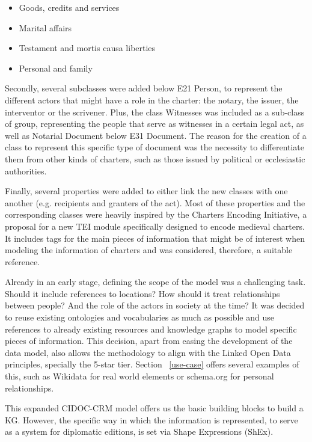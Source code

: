 \documentclass{article}
\begin{document}
\begin{itemize}
    \item Goods, credits and services
    \item Marital affairs
    \item Testament and mortis causa liberties
    \item Personal and family
\end{itemize}

Secondly, several subclasses were added below E21 Person, to represent the different actors that might have a role in the charter: the notary, the issuer, the interventor or the scrivener.
Plus, the class Witnesses was included as a sub-class of group, representing the people that serve as witnesses in a certain legal act, as well as Notarial Document below E31 Document.
The reason for the creation of a class to represent this specific type of document was the necessity to differentiate them from other kinds of charters, such as those issued by political or ecclesiastic authorities.

Finally, several properties were added to either link the new classes with one another (e.g. recipients and granters of the act).
Most of these properties and the corresponding classes were heavily inspired by the Charters Encoding Initiative, a proposal for a new TEI module specifically designed to encode medieval charters\cite{vogeler2014cei}.
It includes tags for the main pieces of information that might be of interest when modeling the information of charters and was considered, therefore, a suitable reference.

Already in an early stage, defining the scope of the model was a challenging task.
Should it include references to locations? How should it treat relationships between people? And the role of the actors in society at the time?
It was decided to reuse existing ontologies and vocabularies as much as possible and use references to already existing resources and knowledge graphs to model specific pieces of information.
This decision, apart from easing the development of the data model, also allows the methodology to align with the Linked Open Data principles, specially the 5-star tier.
Section ~\ref{use-case} offers several examples of this, such as Wikidata for real world elements or schema.org for personal relationships.

This expanded CIDOC-CRM model offers us the basic building blocks to build a KG.
However, the specific way in which the information is represented, to serve as a system for diplomatic editions, is set via Shape Expressions (ShEx).
\end{document}
